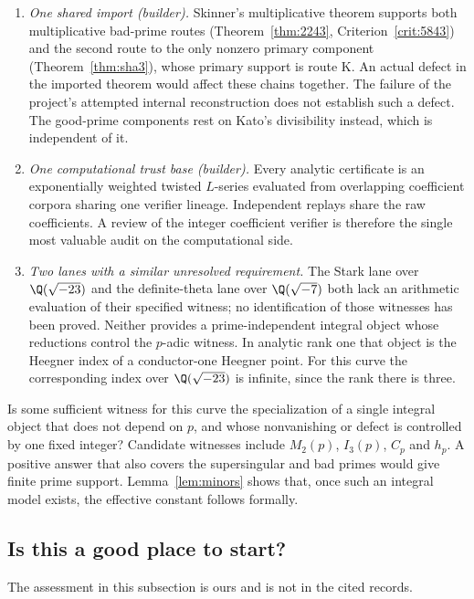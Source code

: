 \begin{enumerate}[label=(\alph*),leftmargin=*]
\item \emph{One shared import (builder).} Skinner's multiplicative theorem supports both multiplicative bad-prime routes (Theorem~\ref{thm:2243}, Criterion~\ref{crit:5843}) and the second route to the only nonzero primary component (Theorem~\ref{thm:sha3}), whose primary support is route K. An actual defect in the imported theorem would affect these chains together. The failure of the project's attempted internal reconstruction does not establish such a defect. The good-prime components rest on Kato's divisibility instead, which is independent of it.

\item \emph{One computational trust base (builder).} Every analytic certificate is an exponentially weighted twisted $L$-series evaluated from overlapping coefficient corpora sharing one verifier lineage. Independent replays share the raw coefficients. A review of the integer coefficient verifier is therefore the single most valuable audit on the computational side.

\item \emph{Two lanes with a similar unresolved requirement.} The Stark lane over $\Q(\sqrt{-23})$ and the definite-theta lane over $\Q(\sqrt{-7})$ both lack an arithmetic evaluation of their specified witness; no identification of those witnesses has been proved. Neither provides a prime-independent integral object whose reductions control the $p$-adic witness. In analytic rank one that object is the Heegner index of a conductor-one Heegner point. For this curve the corresponding index over $\Q(\sqrt{-23})$ is infinite, since the rank there is three.
\end{enumerate}

\begin{question}[\cid{O.4}]\label{q:uniform}
Is some sufficient witness for this curve the specialization of a single integral object that does not depend on $p$, and whose nonvanishing or defect is controlled by one fixed integer? Candidate witnesses include $M_2(p)$, $I_3(p)$, $C_p$ and $h_p$. A positive answer that also covers the supersingular and bad primes would give finite prime support. Lemma~\ref{lem:minors} shows that, once such an integral model exists, the effective constant follows formally.
\end{question}

\subsection{Is this a good place to start?}
The assessment in this subsection is ours and is not in the cited records.

